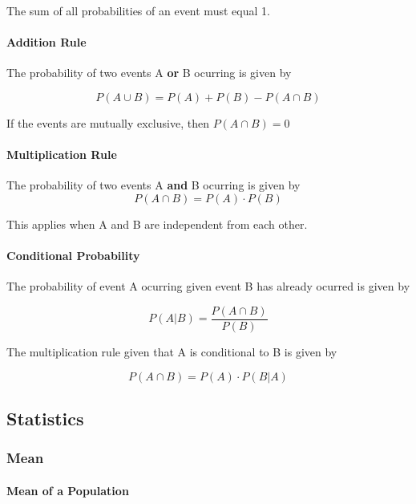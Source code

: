 The sum of all probabilities of an event must equal 1.

\paragraph{Addition Rule} The probability of two events A \textbf{or} B ocurring is given by

\begin{equation}
	P(A \cup B)=P(A)+P(B)-P(A \cap B)
\end{equation}

If the events are mutually exclusive, then \( P(A \cap B) = 0\)

\paragraph{Multiplication Rule}
The probability of two events A \textbf{and} B ocurring is given by
\begin{equation}
	P(A \cap B)=P(A) \cdot P(B)
\end{equation}

This applies when A and B are independent from each other.

\paragraph{Conditional Probability} The probability of event A ocurring given event B has already ocurred is given by

\begin{equation}
	P(A|B) = \frac{P(A \cap B)}{P(B)}
\end{equation}

The multiplication rule given that A is conditional to B is given by

\begin{equation}
	P(A \cap B) = P(A) \cdot P(B|A)
\end{equation}

\subsection{Statistics}
\subsubsection{Mean}

\paragraph{Mean of a Population}

